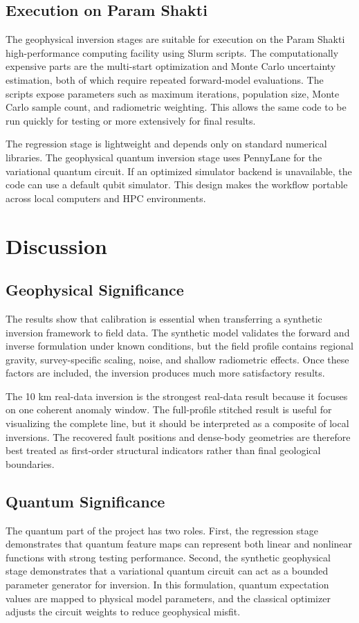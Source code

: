 \documentclass[12pt,a4paper]{article}
\begin{document}
\subsection{Execution on Param Shakti}
The geophysical inversion stages are suitable for execution on the Param Shakti high-performance computing facility using Slurm scripts. The computationally expensive parts are the multi-start optimization and Monte Carlo uncertainty estimation, both of which require repeated forward-model evaluations. The scripts expose parameters such as maximum iterations, population size, Monte Carlo sample count, and radiometric weighting. This allows the same code to be run quickly for testing or more extensively for final results.

The regression stage is lightweight and depends only on standard numerical libraries. The geophysical quantum inversion stage uses PennyLane for the variational quantum circuit. If an optimized simulator backend is unavailable, the code can use a default qubit simulator. This design makes the workflow portable across local computers and HPC environments.

\clearpage
\section{Discussion}
\subsection{Geophysical Significance}
The results show that calibration is essential when transferring a synthetic inversion framework to field data. The synthetic model validates the forward and inverse formulation under known conditions, but the field profile contains regional gravity, survey-specific scaling, noise, and shallow radiometric effects. Once these factors are included, the inversion produces much more satisfactory results.

The 10 km real-data inversion is the strongest real-data result because it focuses on one coherent anomaly window. The full-profile stitched result is useful for visualizing the complete line, but it should be interpreted as a composite of local inversions. The recovered fault positions and dense-body geometries are therefore best treated as first-order structural indicators rather than final geological boundaries.

\subsection{Quantum Significance}
The quantum part of the project has two roles. First, the regression stage demonstrates that quantum feature maps can represent both linear and nonlinear functions with strong testing performance. Second, the synthetic geophysical stage demonstrates that a variational quantum circuit can act as a bounded parameter generator for inversion. In this formulation, quantum expectation values are mapped to physical model parameters, and the classical optimizer adjusts the circuit weights to reduce geophysical misfit.
\end{document}
